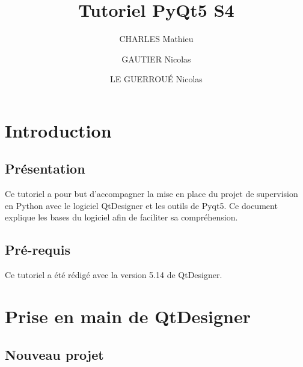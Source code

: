 \documentclass[12pt]{report}    %
\begin{document}
\title{Tutoriel PyQt5 S4}
\author{CHARLES Mathieu \and GAUTIER Nicolas \and LE GUERROUÉ Nicolas}  
\maketitle 
\tableofcontents



\chapter{Introduction}

\section{Présentation}

Ce tutoriel a pour but d'accompagner la mise en place du projet de supervision en Python avec le logiciel QtDesigner et les outils de Pyqt5. Ce document explique les bases du logiciel afin de faciliter sa compréhension.

\section{Pré-requis}

Ce tutoriel a été rédigé avec la version 5.14 de QtDesigner. \newline




\chapter{Prise en main de QtDesigner}

\section{Nouveau projet}
\end{document}
